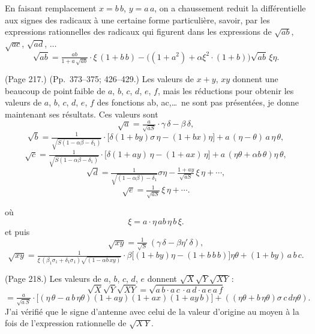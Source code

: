 \documentclass[11pt,a4paper]{article}
\theoremstyle{plain}
\theoremstyle{definition}
\begin{document}
En faisant remplacement $x = b\,b$, $y = a\,a$, on a chaussement reduit la diff\'erentielle aux signes des radicaux \`a une certaine forme particuli\`ere, savoir, par les expressions rationnelles des radicaux qui figurent dans les expressions de $\sqrt{a b}$, $\sqrt{a c}$, $\sqrt{a d}$, $\ldots$
\[
\sqrt{a b} = \tfrac{a b}{1 + a\,\sqrt{a b}}\cdot \xi\,(1 + b\,b) - \big((1 + a^2) + \alpha \xi^2 \cdot (1 + b)\big)\sqrt{a b}\,\xi \eta.
\]

\medskip

\noindent (Page 217.) (Pp.~373--375; 426--429.) Les valeurs de $x + y$, $xy$ donnent une beaucoup de point\,faible de $a$, $b$, $c$, $d$, $e$, $f$, mais les r\'eductions pour obtenir les valeurs de $a$, $b$, $c$, $d$, $e$, $f$ des fonctions ab, ac,\ldots\ ne sont pas pr\'esent\'ees, je donne maintenant ses r\'esultats. Ces valeurs sont
\[
\sqrt{a} = \tfrac{a}{\sqrt{a S}} \cdot \gamma\,\delta - \beta\,\delta,
\]
\[
\sqrt{b} = \tfrac{1}{\sqrt{S(1 - \alpha\beta - \delta_1)}}\cdot \big[\delta(1 + by)\sigma\,\eta - (1 + b x)\eta\big] + a\,(\eta - \theta)\,a\,\eta\,\theta,
\]
\[
\sqrt{c} = \tfrac{1}{\sqrt{S(1 - \alpha\beta - \delta_1)}}\cdot \big[\delta(1 + ay)\,\eta - (1 + a x)\,\eta\big] + a\,(\eta\theta + \alpha b\,\theta)\eta\,\theta,
\]
\[
\sqrt{d} = \tfrac{1}{\sqrt{(1 - \alpha\beta) - \delta_1}}\sigma\eta - \tfrac{1 + a y}{\sqrt{a S}}\,\xi\,\eta + \cdots,
\]
\[
\sqrt{e} = \tfrac{1}{\sqrt{a S}}\,\xi\,\eta + \cdots.
\]

o\`u
\[
\xi = a \cdot \eta\,a b\,\eta\,b\,\xi.
\]
et puis
\[
\sqrt{x y} = \tfrac{1}{\sqrt{S}}\,(\gamma\,\delta - \beta\eta'\,\delta),
\]
\[
\sqrt{x y} = \tfrac{1}{\xi\,(\beta_1\sigma_1 + \delta_1\sigma_1)\sqrt{(1 - \alpha b\,x y)}}\cdot \beta\big[(1 + by)\eta - (1 + b\,b\,b)\big]\eta\theta + (1 + by)\,a\,b\,c.
\]

\medskip

\noindent (Page 218.) Les valeurs de $a$, $b$, $c$, $d$, $e$ donnent $\sqrt{X}\sqrt{Y}\sqrt{X Y}$\,:
\[
\sqrt{X}\sqrt{Y}\sqrt{XY} = \sqrt{a\,b\cdot a\,c\,\cdot a\,d\cdot a\,e\,a\,f}
\]
\[
= \tfrac{a}{\sqrt{a\,S}} \cdot \big[(\eta\,\theta - a\,b\,\eta\theta)(1 + a y)(1 + a x)(1 + ay\,b)\big] + ((\eta\theta + b\,\eta\theta)\sigma\,c\,d\eta\theta).
\]
J'ai v\'erifi\'e que le signe d'antenne avec celui de la valeur d'origine au moyen \`a la fois de l'expression rationnelle de $\sqrt{X\,Y}$.
\end{document}
